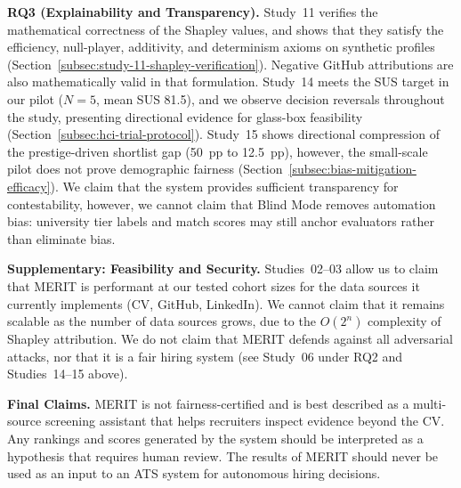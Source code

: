 \textbf{RQ3 (Explainability and Transparency).}
Study~11 verifies the mathematical correctness of the Shapley values, and shows 
that they satisfy the efficiency, null-player, additivity, and determinism axioms on synthetic profiles (Section~\ref{subsec:study-11-shapley-verification}).
Negative GitHub attributions are also mathematically valid in that formulation.
Study~14 meets the SUS target in our pilot ($N=5$, mean SUS 81.5), and we observe decision reversals
throughout the study, presenting directional evidence for glass-box feasibility (Section~\ref{subsec:hci-trial-protocol}).
Study~15 shows directional compression of the prestige-driven shortlist gap (50~pp to 12.5~pp), however, the small-scale pilot does not prove demographic
fairness (Section~\ref{subsec:bias-mitigation-efficacy}).
We claim that the system provides sufficient transparency for contestability, however, we cannot claim that Blind Mode removes automation bias: university tier
labels and match scores may still anchor evaluators rather than eliminate bias.

\textbf{Supplementary: Feasibility and Security.}
Studies~02--03 allow us to claim that MERIT is performant at our tested cohort sizes for the data sources it currently implements (CV, GitHub, LinkedIn).
We cannot claim that it remains scalable as the number of data sources grows, due to the $O(2^n)$ complexity of Shapley attribution.
We do not claim that MERIT defends against all adversarial attacks, nor that it is a fair hiring system (see Study~06 under RQ2 and Studies~14--15 above).

\textbf{Final Claims.}
MERIT is not fairness-certified and is best described as a multi-source screening assistant that helps recruiters inspect evidence beyond the CV.
Any rankings and scores generated by the system should be interpreted as a hypothesis that requires human review. The results of MERIT should never be used 
as an input to an ATS system for autonomous hiring decisions.
